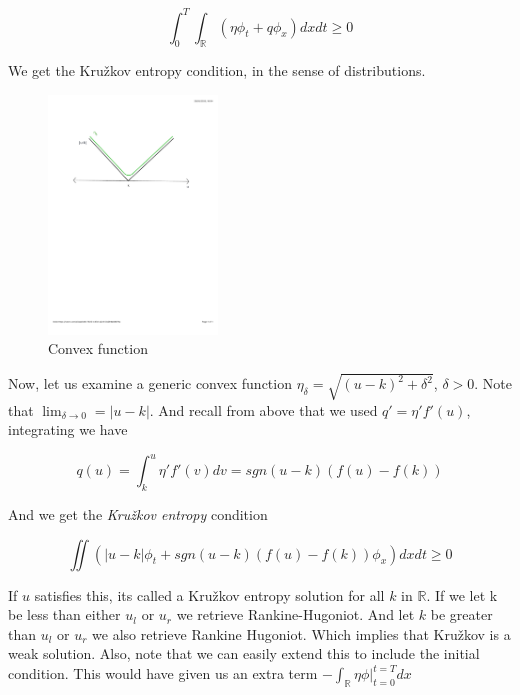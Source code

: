 \documentclass{article}
\numberwithin{equation}{section}
\begin{document}
\begin{equation}
    \int_0^T \int_{\mathbb{R}}( \eta \phi_t + q \phi_x)dxdt \geq 0
    \label{Kruzkov_distributions}
\end{equation}

We get the Kružkov entropy condition, in the sense of distributions. 

\begin{figure}
    \begin{center}
        \includegraphics[valign = c,clip, trim=2cm 18cm 2cm 2cm, width=0.4\textwidth]{Figures/ConservationLaws/convex.pdf}
    \caption{Convex function}
    \label{Fig:convex}
    \end{center}
\end{figure}{}
	  
Now, let us examine a generic convex function $\eta_\delta = \sqrt{(u-k)^2 + \delta^2}$, $\delta > 0 $.  Note that  $\lim_{\delta \to 0} = |u-k|$. And recall from above that we used $q' = \eta' f'(u)$, integrating we have

\begin{equation}
    q(u) = \int_k^u \eta' f'(v) dv = sgn(u-k)(f(u) - f(k))
\end{equation}

And we get the \textit{Kružkov entropy} condition

\begin{equation}
    \iint ( |u-k|\phi_t + sgn(u-k)( f(u) - f(k))\phi_x) dx dt \geq 0
    \label{Kruzkov}
\end{equation}

If $u$ satisfies this, its called a Kružkov entropy solution for all $k$ in $\mathbb{R}$.  If we let k be less than either $u_l$ or $u_r$ we retrieve Rankine-Hugoniot. And let $k$ be greater than $u_l$ or $u_r$ we also retrieve Rankine Hugoniot. Which implies that Kružkov is a weak solution. Also, note that we can easily extend this to include the initial condition. This would have given us an extra term $- \int_\mathbb{R} \eta \phi |_{t= 0}^{t = T} dx$
\end{document}
